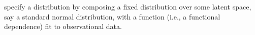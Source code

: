     specify a distribution
    by composing a fixed
    distribution
    over some latent space,
    say a standard normal distribution,
    with a function (i.e., a functional dependence) fit to observational data.
%
%
